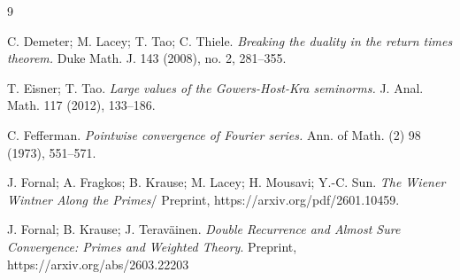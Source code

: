 \documentclass[12pt]{amsart}
\numberwithin{equation}{section}
\theoremstyle{definition}
\begin{document}
\begin{thebibliography}{9}






C. Demeter; M. Lacey; T. Tao; C. Thiele. \emph{ 
Breaking the duality in the return times theorem. }
Duke Math. J. 143 (2008), no. 2, 281–355.




T. Eisner; T. Tao.
\emph{Large values of the Gowers-Host-Kra seminorms.}
J. Anal. Math. 117 (2012), 133–186.


C. Fefferman.
\emph{Pointwise convergence of Fourier series.}
Ann. of Math. (2) 98 (1973), 551–571.

J. Fornal; A. Fragkos; B. Krause; M. Lacey; H. Mousavi; Y.-C. Sun. \emph{The Wiener Wintner Along the Primes}/ Preprint,
https://arxiv.org/pdf/2601.10459.


J. Fornal; B. Krause; J. Terav\"{a}inen.
\emph{Double Recurrence and Almost Sure Convergence: Primes and Weighted Theory}.
Preprint, https://arxiv.org/abs/2603.22203








\end{thebibliography}
\end{document}
